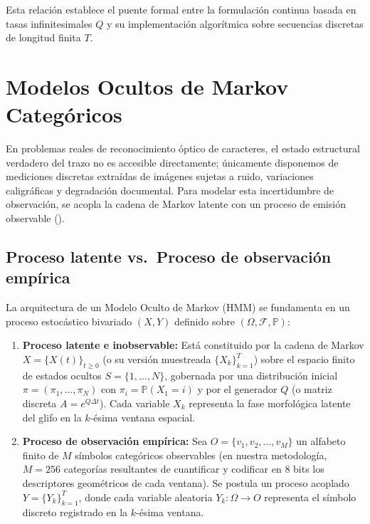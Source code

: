 \documentclass[
  spanish,
  us-letterpaper,
]{scrreprt}
\theoremstyle{definition}
\theoremstyle{remark}
\begin{document}
Esta relación establece el puente formal entre la formulación continua
basada en tasas infinitesimales \(Q\) y su implementación algorítmica
sobre secuencias discretas de longitud finita \(T\).

\section{Modelos Ocultos de Markov
Categóricos}\label{modelos-ocultos-de-markov-categuxf3ricos}

En problemas reales de reconocimiento óptico de caracteres, el estado
estructural verdadero del trazo no es accesible directamente; únicamente
disponemos de mediciones discretas extraídas de imágenes sujetas a
ruido, variaciones caligráficas y degradación documental. Para modelar
esta incertidumbre de observación, se acopla la cadena de Markov latente
con un proceso de emisión observable ().

\subsection{Proceso latente vs.~Proceso de observación
empírica}\label{proceso-latente-vs.-proceso-de-observaciuxf3n-empuxedrica}

La arquitectura de un Modelo Oculto de Markov (HMM) se fundamenta en un
proceso estocástico bivariado \((X, Y)\) definido sobre
\((\Omega, \mathcal{F}, \mathbb{P})\):

\begin{enumerate}
\def\labelenumi{\arabic{enumi}.}
\item
  \textbf{Proceso latente e inobservable:} Está constituido por la
  cadena de Markov \(X = \{X(t)\}_{t \ge 0}\) (o su versión muestreada
  \(\{X_k\}_{k=1}^T\)) sobre el espacio finito de estados ocultos
  \(S = \{1, \dots, N\}\), gobernada por una distribución inicial
  \(\pi = (\pi_1, \dots, \pi_N)\) con \(\pi_i = \mathbb{P}(X_1 = i)\) y
  por el generador \(Q\) (o matriz discreta \(A = e^{Q\Delta t}\)). Cada
  variable \(X_k\) representa la fase morfológica latente del glifo en
  la \(k\)-ésima ventana espacial.
\item
  \textbf{Proceso de observación empírica:} Sea
  \(O = \{v_1, v_2, \dots, v_M\}\) un alfabeto finito de \(M\) símbolos
  categóricos observables (en nuestra metodología, \(M = 256\)
  categorías resultantes de cuantificar y codificar en 8 bits los
  descriptores geométricos de cada ventana). Se postula un proceso
  acoplado \(Y = \{Y_k\}_{k=1}^T\), donde cada variable aleatoria
  \(Y_k : \Omega \to O\) representa el símbolo discreto registrado en la
  \(k\)-ésima ventana.
\end{enumerate}
\end{document}
